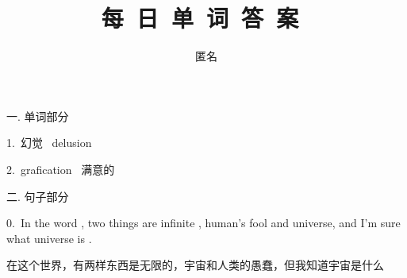 \documentclass[a4paper, 12pt]{article}
\begin{document}
    \noindent

    \title{ 每\ 日\ 单\ 词\ 答\ 案\  }
    \author{ 匿名 }
    \maketitle

\begin{flushleft}
一. 单词部分
\end{flushleft}

\begin{multicols}{2}
\begin{flushleft}
1.\ 幻觉 \ delusion
\end{flushleft}

\begin{flushleft}
2.\ grafication \ 满意的
\end{flushleft}
\end{multicols}

\begin{flushleft}
二. 句子部分
\end{flushleft}

\begin{flushleft}
0.\ In the word , two things are infinite , human's fool and universe, and I'm sure what universe is .

在这个世界，有两样东西是无限的，宇宙和人类的愚蠢，但我知道宇宙是什么
\end{flushleft}
\end{document}
